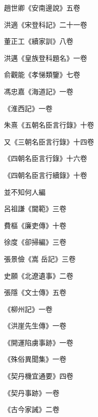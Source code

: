 \begin{pinyinscope}
 趙世卿《安南邊說》五卷



 洪適《宋登科記》二十一卷



 董正工《續家訓》八卷



 洪邁《皇族登科題名》一卷



 俞觀能《孝悌類鑒》七卷



 馮忠嘉《海道記》一卷



 《淮西記》一卷



 朱熹《五朝名臣言行錄》十卷



 又《三朝名臣言行錄》十四卷



 《四朝名臣言行錄》十六卷



 《四朝名臣言行續錄》十卷



 並不知何人編



 呂祖謙《閫範》三卷



 費樞《廉吏傳》十卷



 徐度《卻掃編》三卷



 張景儉《嵩
 岳記》三卷



 史願《北遼遺事》二卷



 張隱《文士傳》五卷



 《柳州記》一卷



 《洪崖先生傳》一卷



 《開運陷虜事跡》一卷



 《殊俗異聞集》一卷



 《契丹機宜通要》四卷



 《契丹事跡》一卷



 《古今家誡》二卷




\end{pinyinscope}
